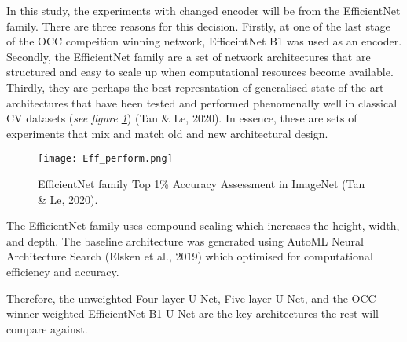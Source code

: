 \documentclass[11pt, a4paper, twoside]{report}
\begin{document}
In this study, the experiments with changed encoder will be from the EfficientNet family. There are three reasons for this decision. Firstly, at one of the last stage of the OCC compeition winning network, EfficeintNet B1 was used as an encoder. Secondly, the EfficientNet family are a set of network architectures that are structured and easy to scale up when computational resources become available. Thirdly, they are perhaps the best represntation of generalised state-of-the-art architectures that have been tested and performed phenomenally well in classical CV datasets (\textit{see figure \ref{fig:Eff_perform}}) (Tan \& Le, 2020). In essence, these are sets of experiments that mix and match old and new architectural design.\\\par

\begin{figure}[H]
  \centering
  \texttt{[image: Eff\_perform.png]}
  \caption{EfficientNet family Top 1\% Accuracy Assessment in ImageNet (Tan \& Le, 2020).}
  \label{fig:Eff_perform}
\end{figure}

The EfficientNet family uses compound scaling which increases the height, width, and depth. The baseline architecture was generated using AutoML Neural Architecture Search (Elsken et al., 2019) which optimised for computational efficiency and accuracy.\\\par

Therefore, the unweighted Four-layer U-Net, Five-layer U-Net, and the OCC winner weighted EfficientNet B1 U-Net are the key architectures the rest will compare against.


\begin{table}[H]
  \centering
\end{table}
\end{document}
